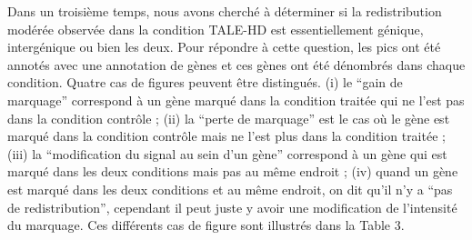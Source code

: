 \documentclass[a4paper,12pt,times]{report}
\begin{document}
\newpage
Dans un troisième temps, nous avons cherché à déterminer si la redistribution modérée observée dans la condition TALE-HD est essentiellement génique, intergénique ou bien les deux.
Pour répondre à cette question, les pics ont été annotés avec une annotation de gènes et  ces gènes ont été dénombrés dans chaque condition.
\newline Quatre cas de figures peuvent être distingués. (i) le ``gain de marquage''  correspond à un gène marqué dans la condition traitée qui ne l'est pas dans la condition contrôle ;
(ii) la ``perte de marquage'' est le cas où le gène est marqué dans la condition contrôle mais ne l'est plus dans la condition traitée ; (iii)
la ``modification du signal au sein d'un gène'' correspond à un gène qui est marqué dans les deux conditions mais pas au même endroit ; (iv)
quand un gène est marqué dans les deux conditions et au même endroit, on dit qu'il n'y a ``pas de redistribution'', cependant il peut juste y avoir une modification de l'intensité du marquage.
Ces différents cas de figure sont illustrés dans la Table 3.
 
\end{document}

